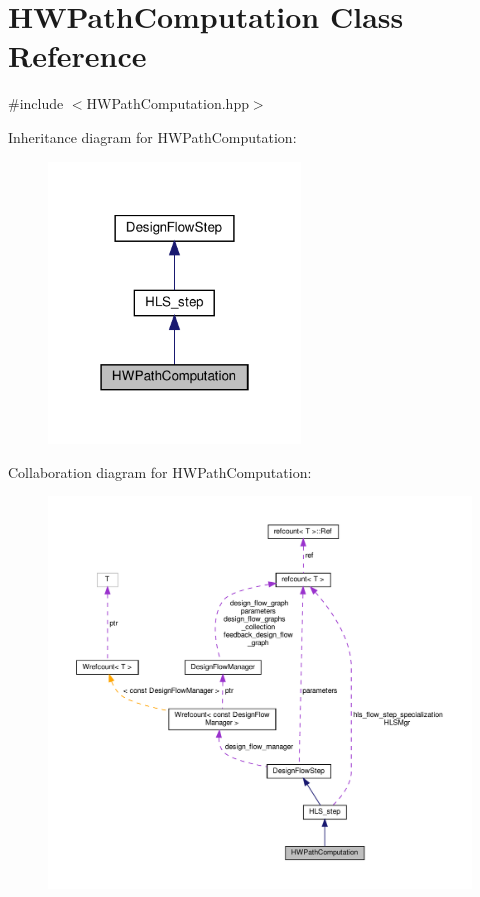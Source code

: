 \hypertarget{classHWPathComputation}{}\section{H\+W\+Path\+Computation Class Reference}
\label{classHWPathComputation}


{\ttfamily \#include $<$H\+W\+Path\+Computation.\+hpp$>$}



Inheritance diagram for H\+W\+Path\+Computation\+:
\nopagebreak
\begin{figure}[H]
\begin{center}
\leavevmode
\includegraphics[width=190pt]{df/d2f/classHWPathComputation__inherit__graph}
\end{center}
\end{figure}


Collaboration diagram for H\+W\+Path\+Computation\+:
\nopagebreak
\begin{figure}[H]
\begin{center}
\leavevmode
\includegraphics[width=350pt]{d5/da4/classHWPathComputation__coll__graph}
\end{center}
\end{figure}
